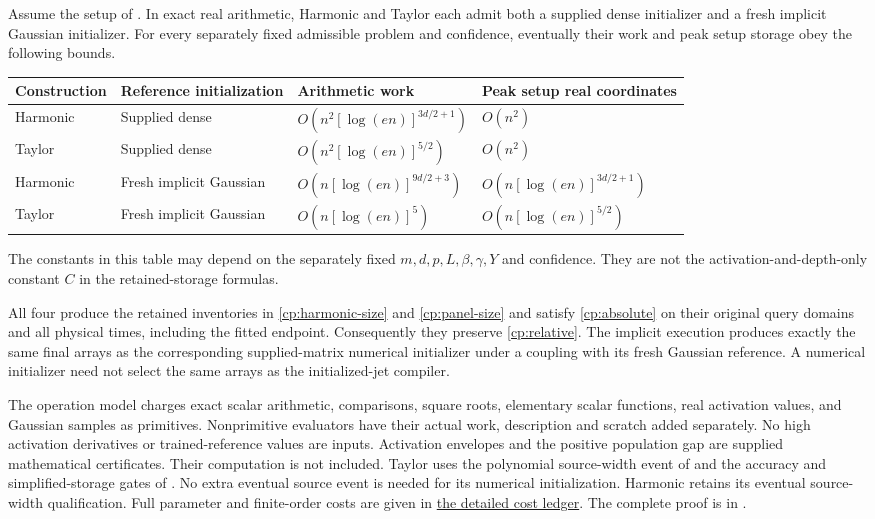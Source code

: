 \begin{proposition}
\label{cp:initialization}

Assume the setup of . In exact real arithmetic,
Harmonic and Taylor each admit both a supplied dense initializer and a fresh implicit Gaussian initializer. For
every separately fixed admissible problem and confidence, eventually their
work and peak setup storage obey the following bounds.

\begin{center}\footnotesize
\begin{tabular}{@{}p{.13\linewidth}p{.24\linewidth}p{.29\linewidth}p{.25\linewidth}@{}}
\toprule
Construction & Reference initialization & Arithmetic work & Peak setup real coordinates\\
\midrule
Harmonic & Supplied dense & $O(n^2[\log(en)]^{3d/2+1})$ & $O(n^2)$\\
Taylor & Supplied dense & $O(n^2[\log(en)]^{5/2})$ & $O(n^2)$\\
Harmonic & Fresh implicit Gaussian & $O(n[\log(en)]^{9d/2+3})$ & $O(n[\log(en)]^{3d/2+1})$\\
Taylor & Fresh implicit Gaussian & $O(n[\log(en)]^5)$ & $O(n[\log(en)]^{5/2})$\\
\bottomrule
\end{tabular}
\end{center}

The constants in this table may depend on the separately fixed
$m,d,p,L,\beta,\gamma,Y$ and confidence. They are not the
activation-and-depth-only constant $C$ in the retained-storage formulas.

All four produce the retained inventories in
\eqref{cp:harmonic-size} and \eqref{cp:panel-size} and satisfy
\eqref{cp:absolute} on their original query domains and all physical
times, including the fitted endpoint. Consequently they preserve
\eqref{cp:relative}. The implicit execution produces exactly the
same final arrays as the corresponding supplied-matrix numerical initializer
under a coupling with its fresh Gaussian reference. A numerical initializer
need not select the same arrays as the initialized-jet compiler.

The operation model charges exact scalar arithmetic, comparisons, square
roots, elementary scalar functions, real activation values, and Gaussian
samples as primitives. Nonprimitive evaluators have their actual work,
description and scratch added separately. No high activation derivatives or
trained-reference values are inputs. Activation envelopes and the positive
population gap are supplied mathematical certificates. Their computation
is not included. Taylor uses the polynomial source-width event of
 and the accuracy and simplified-storage
gates of . No extra eventual source event
is needed for its numerical initialization. Harmonic retains its eventual
source-width qualification. Full parameter and finite-order costs are given
in \hyperref[cp:init:sec:costs]{the detailed cost ledger}. The complete proof is in .
\end{proposition}
